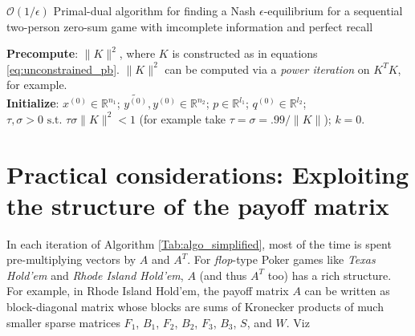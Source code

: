 \documentclass{article} %
\begin{document}
\begin{algorithm}[G_2]
  \caption{$\mathcal{O}(1/\epsilon)$ Primal-dual algorithm for finding a Nash $\epsilon$-equilibrium for a sequential two-person zero-sum game with imcomplete information and perfect recall}
  \textbf{Precompute}: $\|K\|^2$, where $K$ is constructed as in equations \eqref{eq:unconstrained_pb}. $\|K\|^2$ can be computed via a \textit{power iteration} on $K^TK$, for example.\\
  \textbf{Initialize}:
  $x^{(0)} \in \mathbb{R}^{n_1}$; $\tilde{y^{(0)}}, y^{(0)} \in \mathbb{R}^{n_2}$; $p \in \mathbb{R}^{l_1}$; $q^{(0)} \in \mathbb{R}^{l_2}$; 
  $\tau, \sigma > 0 \text{ s.t. }\tau\sigma \|K\|^2 < 1$ (for example take $\tau = \sigma = .99/\|K\|$); $k = 0$.\\
  \label{Tab:algo_simplified}
\end{algorithm}

\section{Practical considerations: Exploiting the structure of the payoff matrix}
In each iteration of Algorithm \ref{Tab:algo_simplified}, most of the time is spent
pre-multiplying vectors by $A$ and $A^T$. For \textit{flop}-type Poker games like \textit{Texas Hold'em} and  \textit{Rhode Island Hold'em}, $A$ (and thus $A^T$ too) has a rich structure. For example, in Rhode Island Hold'em, the payoff matrix $A$ can be written as block-diagonal matrix whose blocks are sums of Kronecker products of much smaller sparse matrices \cite{hoda2010smoothing} $F_1$, $B_1$, $F_2$, $B_2$, $F_3$, $B_3$, $S$, and $W$. Viz
\end{document}
